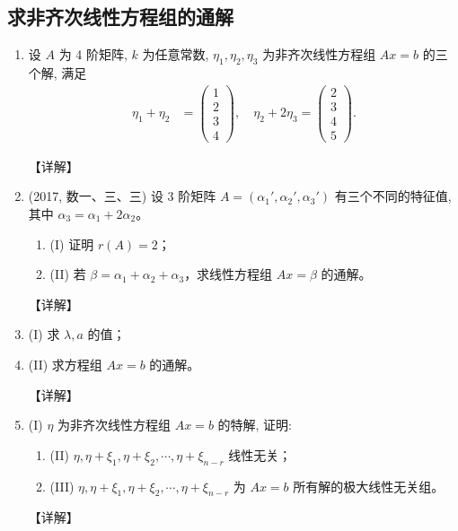 \documentclass[12pt, a4paper, oneside, UTF8]{ctexbook}
\begin{document}
\subsection{求非齐次线性方程组的通解}

\begin{enumerate}[label=\arabic*.,start=5]
    \item 设 $A$ 为 4 阶矩阵, $k$ 为任意常数, $\eta_1, \eta_2, \eta_3$ 为非齐次线性方程组 $Ax = b$ 的三个解, 满足
    \begin{align*}
    \eta_1 + \eta_2 &= \begin{pmatrix} 1 \\ 2 \\ 3 \\ 4 \end{pmatrix}, \quad \eta_2 + 2\eta_3 = \begin{pmatrix} 2 \\ 3 \\ 4 \\ 5 \end{pmatrix}.
    \end{align*}
    
    \begin{solution}
    【详解】
    \end{solution}
    
    \item (2017, 数一、三、三) 设 3 阶矩阵 $A = (\alpha_1', \alpha_2', \alpha_3')$ 有三个不同的特征值, 其中 $\alpha_3 = \alpha_1 + 2\alpha_2$。
    \begin{enumerate}
        \item (I) 证明 $r(A) = 2$；
        \item (II) 若 $\beta = \alpha_1 + \alpha_2 + \alpha_3$，求线性方程组 $Ax = \beta$ 的通解。
    \end{enumerate}
    
    \begin{solution}
    【详解】
    \end{solution}
    
    \item (I) 求 $\lambda, a$ 的值；
    \item (II) 求方程组 $Ax = b$ 的通解。
    
    \begin{solution}
    【详解】
    \end{solution}
    
    \item (I) $\eta$ 为非齐次线性方程组 $Ax = b$ 的特解, 证明:
    \begin{enumerate}
        \item (II) $\eta, \eta + \xi_1, \eta + \xi_2, \cdots, \eta + \xi_{n-r}$ 线性无关；
        \item (III) $\eta, \eta + \xi_1, \eta + \xi_2, \cdots, \eta + \xi_{n-r}$ 为 $Ax = b$ 所有解的极大线性无关组。
    \end{enumerate}
    
    \begin{solution}
    【详解】
    \end{solution}
\end{enumerate}
\end{document}
